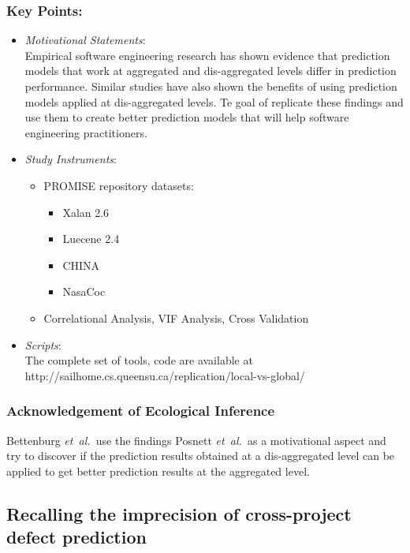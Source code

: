 \documentclass{sig-alternate-05-2015}
\newcommand{\etal}{\mbox{\emph{et al.\ }}}
\begin{document}
\subsubsection{Key Points:}
\begin{itemize}
\item \emph{Motivational Statements}: \\
 Empirical software engineering research has shown evidence that prediction models that work at aggregated and dis-aggregated levels differ in prediction performance. Similar studies have also shown the benefits of using prediction models applied at dis-aggregated levels. Te goal of replicate these findings and use them to create better prediction models that will help software engineering practitioners.
\item \emph{ Study Instruments}:
	\begin{itemize}
		\item PROMISE repository datasets:
			\begin{itemize}
				\item Xalan 2.6
				\item Luecene 2.4
				\item CHINA
				\item NasaCoc
			\end{itemize}
		\item Correlational Analysis, VIF Analysis, Cross Validation
	\end{itemize}
\item \emph{Scripts}: \\
The complete set of tools, code are available at \\
http://sailhome.cs.queensu.ca/replication/local-vs-global/
\end{itemize}

\subsubsection{Acknowledgement of Ecological Inference}
Bettenburg \etal use the findings Posnett \etal as a motivational aspect and try to discover if the prediction results obtained at a dis-aggregated level can be applied to get better prediction results at the aggregated level.

\subsection{Recalling the imprecision of cross-project defect prediction \cite{Rahman:2012}}
\end{document}
